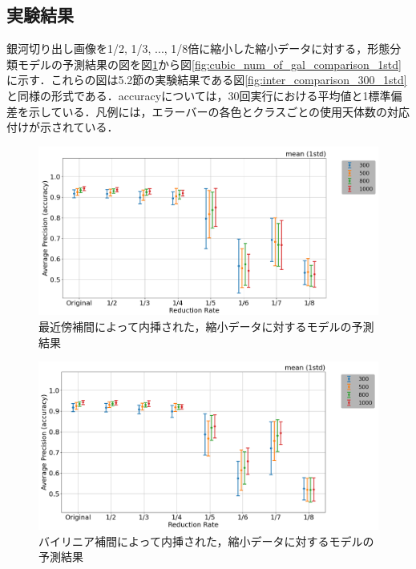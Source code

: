 \documentclass[a4j, 11pt]{jreport}
\begin{document}
\subsection{実験結果}
銀河切り出し画像を1/2, 1/3, ..., 1/8倍に縮小した縮小データに対する，形態分類モデルの予測結果の図を図\ref{fig:nearest_num_of_gal_comparison_1std}から図\ref{fig:cubic_num_of_gal_comparison_1std}に示す．これらの図は5.2節の実験結果である図\ref{fig:inter_comparison_300_1std}と同様の形式である．accuracyについては，30回実行における平均値と1標準偏差を示している．凡例には，エラーバーの各色とクラスごとの使用天体数の対応付けが示されている．

\begin{figure}[H]
  \centering
  \includegraphics[width=1.0\hsize, keepaspectratio]{images/5syou/print_errorbar/nearest/acc_with_errorbar_syuron5_nearest_900epoch_30run_num_of_gal_comparison_acc_max_std1sigma.png}
  \caption{最近傍補間によって内挿された，縮小データに対するモデルの予測結果}
  \label{fig:nearest_num_of_gal_comparison_1std}
\end{figure}

\begin{figure}[H]
  \centering
  \includegraphics[width=1.0\hsize, keepaspectratio]{images/5syou/print_errorbar/linear/acc_with_errorbar_syuron5_linear_900epoch_30run_num_of_gal_comparison_acc_max_std1sigma.png}
  \caption{バイリニア補間によって内挿された，縮小データに対するモデルの予測結果}
  \label{fig:linear_num_of_gal_comparison_1std}
\end{figure}
\end{document}
